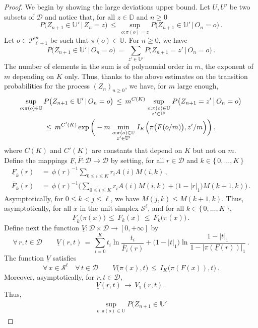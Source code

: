 \documentclass[a4paper,12pt]{article}
\theoremstyle{definition}
\theoremstyle{remark}
\def \cD {\mathcal{D}}
\def \cP {\mathcal{P}}
\def \cS {\mathcal{S}}
\def \dD {\mathbb{D}}
\def \dU {\mathbb{U}}
\def \lra {\longrightarrow}
\def \Zt {(Z_n)_{n\geq 0}}
\def \pml {\cP^m_{\ell +1}}
\def \zk {\{\, 0,\dots,K \,\}}
\begin{document}
\begin{proof}
We begin by showing the large deviations upper bound.
Let $U,U'$
be two subsets of
$\cD$ and notice that, for all $z\in\dD$ and $n\geq0$
$$P\big(
Z_{n+1}\in \dU'\,\big|\, Z_n=z
\big)\,\leq\,
\sup_{o:\pi(o)=z}P\big(
Z_{n+1}\in  \dU'\,\big|\,O_n=o
\big)\,.$$
Let $o\in\pml$ be such that $\pi(o)\in \dU$.
For 
$n\geq 0$, we have
$$
P\big(Z_{n+1}\in \dU'
\,\big|\, O_n=o\big)\,=\,
\sum_{z'\in \dU'} P\big(
Z_{n+1}=z'\,\big|\, O_n=o
\big)\,.
$$
The number of elements in the sum is of polynomial order in $m$,
the exponent of $m$ depending on $K$ only.
Thus,
thanks to the above estimates on 
the transition probabilities for the process $\Zt$,
we have, for $m$ large enough,
\begin{multline*}
\sup_{o:\pi(o)\in \dU}P\big(Z_{n+1}\in \dU'
\,|\, O_n=o\big)
\,\leq\,
m^{C(K)}\sup_{\genfrac{}{}{0pt}{1}{o:\pi(o)\in \dU}
{z'\in \dU'}}
P\big(
Z_{n+1}=z'\,\big|\,O_n=o
\big)\\
\leq\,m^{C'(K)}\exp\bigg(
-m\min_{\genfrac{}{}{0pt}{1}{o:\pi(o)\in \dU}
{z'\in \dU'}}
I_K\Big(
\pi\big(F(o/m)\big),z'/m
\Big)
\bigg)\,.
\end{multline*}
where
$C(K)$  and $C'(K)$
are constants that depend on
$K$ 
but not on 
$m$.
Define the mappings $\underline{F},\overline{F}:\cD\lra\cD$ by
setting, for all $r\in\cD$ and $k\in\lbrace\,0,\dots,K\,\rbrace$
\begin{align*}
\underline{F}_k(r)\,&=\,\phi(r)^{-1}\sum_{0\leq i\leq K}
r_i A(i)M(i,k)\,,\\
\overline{F}_k(r)\,&=\,\phi(r)^{-1}\bigg(\sum_{0\leq i\leq K}
r_i A(i)M(i,k)+\big(
1-|r|_1 
\big)M(k+1,k)\bigg)\,.
\end{align*}
Asymptotically,
for $0\leq k<j\leq\ell$,
we have $M(j,k)\leq M(k+1,k)$.
Thus, asymptotically, for all $x$ in the unit simplex $\cS^\ell$,
and for all $k\in\zk$,
$$\underline{F}_k\big(
\pi(x)
\big)\,\leq\,F_k(x)\,\leq\,
\overline{F}_k\big(
\pi(x)
\big)\,.$$
Define next the function $\underline{V}:\cD\times\cD\lra[0,+\infty]$
by
$$\forall\, r,t\in\cD\qquad
\underline{V}(r,t)\,=\,\sum_{i=0}^K t_i\ln\frac{t_i}{\overline{F}_i(r)}
+\big(
1-|t|_1\big)
\ln\frac{1-|t|_1}{1-\big|
\pi(\underline{F}(r))
\big|_1}\,.$$
The function $\underline{V}$ satisfies
$$\forall\, x\in\cS^{\ell}\quad \forall\, t\in\cD\qquad
\underline{V}\big(
\pi(x),t
\big)\,\leq\,I_K\big(
\pi(F(x)),t
\big)\,.$$
Moreover, asymptotically, for $r,t\in\cD$,
$$\underline{V}(r,t)\,\lra\,V_1(r,t)\,.$$
Thus,
\begin{multline*}
\sup_{o:\pi(o)\in \dU}P\big(Z_{n+1}\in \dU'

\end{multline*}
\end{proof}
\end{document}
